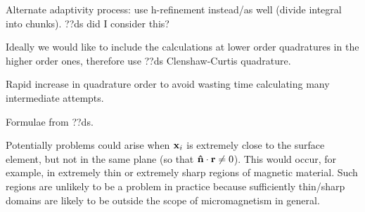 Alternate adaptivity process: use h-refinement instead/as well (divide integral into chunks).
??ds did I consider this?

Ideally we would like to include the calculations at lower order quadratures in the higher order ones, therefore use ??ds Clenshaw-Curtis quadrature\cite{Trefethen2008}.

Rapid increase in quadrature order to avoid wasting time calculating many intermediate attempts.

Formulae from ??ds.

Potentially problems could arise when $\mathbf{x}_i$ is extremely close to the surface element, but not in the same plane (so that $\mathbf{\hat{n}} \cdot \mathbf{r} \neq 0$).
This would occur, for example, in extremely thin or extremely sharp regions of magnetic material.
Such regions are unlikely to be a problem in practice because sufficiently thin/sharp domains are likely to be outside the scope of micromagnetism in general.



